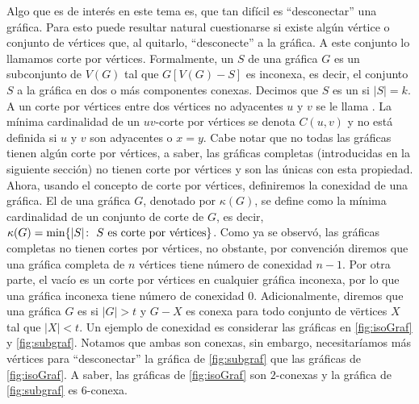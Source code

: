 Algo que es de inter\'es en este tema es, que tan dif\'icil es ``desconectar''
una gr\'afica. Para esto puede resultar natural cuestionarse si existe alg\'un
v\'ertice o conjunto de v\'ertices que, al quitarlo, ``desconecte'' a la
gr\'afica. A este conjunto lo llamamos corte por v\'ertices. Formalmente, un
 $S$ de una gr\'afica $G$ es un subconjunto de
$V(G)$ tal que $G[V(G)-S]$ es inconexa, es decir, el conjunto $S$
 a la gr\'afica en dos o m\'as componentes conexas. Decimos que
$S$ es un  si $|S|=k$. A un corte por
v\'ertices entre dos v\'ertices no adyacentes $u$ y $v$ se le llama
. La m\'inima cardinalidad de un $uv$-corte
por v\'ertices se denota $C(u,v)$ y no est\'a definida si $u$ y $v$ son
adyacentes o $x=y$.  Cabe notar que no todas las gr\'aficas tienen alg\'un corte
por v\'ertices, a saber, las gr\'aficas completas (introducidas en la siguiente
secci\'on) no tienen corte por v\'ertices y son las \'unicas con esta propiedad.
Ahora, usando el concepto de corte por v\'ertices, definiremos la conexidad de
una gr\'afica. El  de una gr\'afica $G$, denotado
por $\kappa(G)$, se define como la m\'inima cardinalidad de un conjunto de corte
de $G$, es decir, $\kappa(G)=\min \{|S| \colon\ S \textnormal{ es corte por
v\'ertices}\}$. Como ya se observ\'o, las gr\'aficas completas no tienen cortes
por v\'ertices, no obstante, por convenci\'on diremos que una gr\'afica completa
de $n$ v\'ertices tiene n\'umero de conexidad $n-1$. Por otra parte, el vac\'io
es un corte por v\'ertices en cualquier gr\'afica inconexa, por lo que una
gr\'afica inconexa tiene n\'umero de conexidad $0$. Adicionalmente, diremos que
una gr\'afica $G$ es  si $|G|>t$ y $G-X$ es conexa para todo
conjunto de v\"ertices $X$ tal que $|X|<t$. Un ejemplo de conexidad es
considerar las gr\'aficas en \cref{fig:isoGraf} y \cref{fig:subgraf}. Notamos
que ambas son conexas, sin embargo, necesitar\'iamos m\'as v\'ertices para
``desconectar'' la gr\'afica de \cref{fig:subgraf} que las gr\'aficas de
\cref{fig:isoGraf}. A saber, las gr\'aficas de \cref*{fig:isoGraf} son
$2$-conexas y la gr\'afica de \cref{fig:subgraf} es $6$-conexa.

